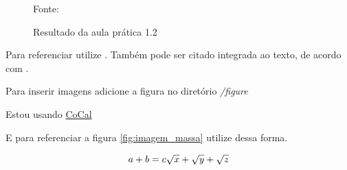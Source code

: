 \begin{figure}[H] %
  \center
  \caption{Resultado da aula prática 1.2}

  {\fontsize{10pt}{\baselineskip}\selectfont Fonte: }
  \label{fig:ap1_cod_vigual1}
\end{figure}



Para referenciar utilize \cite{ninguem2022curioso}. Também pode ser citado integrada ao texto, de acordo com .

Para inserir imagens adicione a figura no diretório \textit{/figure}


\par Estou usando \href {https://cocalc.com/} {CoCal}

E para referenciar a figura \ref{fig:imagem_massa} utilize dessa forma.

\begin{equation}
  a + b = c \label{1}
  $$ $$ %
  \sqrt{x} + \sqrt{\smash[b]{y}} + \sqrt{z}
\end{equation}


